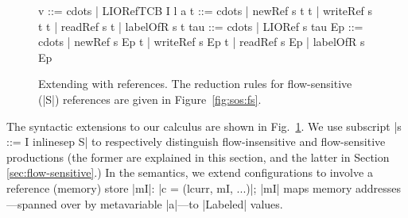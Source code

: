 \begin{figure}[t]
\small
\begin{code}
v    ::= cdots  | LIORefTCB I l a
t    ::= cdots  | newRef s t t | writeRef s t t | readRef s t
                | labelOfR s t
tau  ::= cdots  | LIORef s tau
Ep   ::= cdots  | newRef s Ep t | writeRef s Ep t | readRef s Ep 
                | labelOfR s Ep
\end{code}

\caption{Extending \lio{} with references. The reduction rules for
flow-sensitive (|S|) references are given in Figure~\ref{fig:sos:fs}.
\label{fig:sos:refs}}
\end{figure}
%
The syntactic extensions to our calculus are shown in Fig.~\ref{fig:sos:refs}.
%
We use subscript |s ::= I inlinesep S| to respectively distinguish
flow-insensitive and flow-sensitive productions (the former are explained in this
section, and the latter in Section \ref{sec:flow-sensitive}.)
%
In the semantics, we extend configurations to involve a reference (memory) store |mI|: |c = (lcurr, mI, ...)|;
%
|mI| maps memory addresses---spanned over by metavariable |a|---to |Labeled|
values.
%
%

